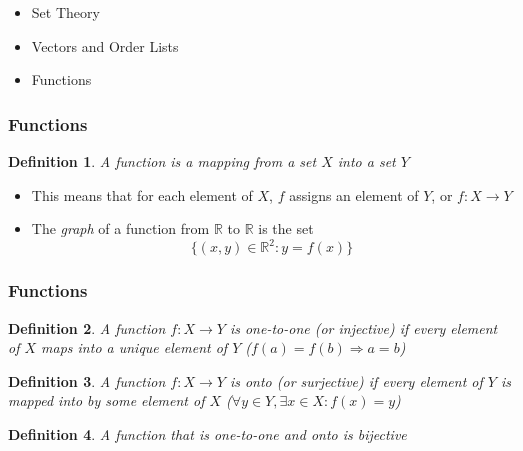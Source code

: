 \documentclass{beamer}
\newtheorem{defn}{Definition}
\numberwithin{equation}{section}
\begin{document}
\begin{frame}

\begin{itemize}
\item \textcolor{mygray}{Set Theory}
\item \textcolor{mygray}{Vectors and Order Lists}
\item \textcolor{myblack}{Functions}
\end{itemize}

\end{frame}



\begin{frame}
\frametitle{Functions}
\begin{defn}
A \textit{function} is a mapping from a set $X$ into a set $Y$
\end{defn}
\pause

\begin{itemize}
\item This means that for each element of $X$, $f$ assigns an element of $Y$, or $f: X\rightarrow Y$ \pause
\end{itemize}

\begin{itemize}
\item The \textit{graph} of a function from $\mathbb{R} $ to $\mathbb{R}$ is the set $$\{(x, y)\in \mathbb{R}^2: y=f(x)\}$$ 
\end{itemize}
\end{frame}



\begin{frame}
\frametitle{Functions}

\begin{defn}
A function $f: X\rightarrow Y$ is \textit{one-to-one} (or injective) if every element of $X$ maps into a unique element of $Y$ ($f(a)=f(b)\Rightarrow a=b$)
\end{defn}
\pause

\begin{defn}
A function $f: X\rightarrow Y$ is \textit{onto} (or surjective) if every element of $Y$ is mapped into by some element of $X$ ($\forall y\in Y, \exists x\in X: f(x)=y$) \pause
\end{defn}
\pause

\begin{defn}
A function that is one-to-one and onto is bijective
\end{defn}

\end{frame}
\end{document}
